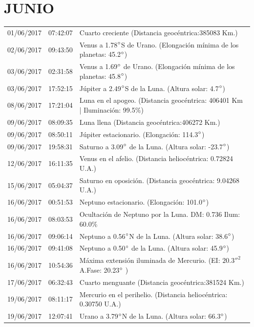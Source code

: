 \documentclass[12pt,a4paper,oneside]{article}
\begin{document}
\section{JUNIO}
\begin{center}
\begin{tabular}{ |l| l| l| }
\hline
01/06/2017& 07:42:07 &	Cuarto creciente (Distancia geocéntrica:385083 Km.)	\\
02/06/2017& 09:43:50 &	Venus a 1.78$\degree $S de Urano. (Elongación mínima de los planetas: 45.2$\degree $)	\\
03/06/2017& 02:31:58 &	Venus a 1.69$\degree $ de Urano. (Elongación mínima de los planetas: 45.8$\degree $)	\\
03/06/2017& 17:52:15 &	Júpiter a 2.49$\degree $S de la Luna. (Altura solar: 4.7$\degree $)	\\
08/06/2017& 17:21:04 &	Luna en el apogeo. (Distancia geocéntrica: 406401 Km | Iluminación: 99.5\%)	\\
09/06/2017& 08:09:35 &	Luna llena (Distancia geocéntrica:406272 Km.)	\\
09/06/2017& 08:50:11 &	Júpiter estacionario. (Elongación: 114.3$\degree $)	\\
09/06/2017& 19:58:31 &	Saturno a 3.09$\degree $ de la Luna. (Altura solar: -23.7$\degree $)	\\
12/06/2017& 16:11:35 &	Venus en el afelio. (Distancia heliocéntrica: 0.72824 U.A.)	\\
15/06/2017& 05:04:37 &	Saturno en oposición. (Distancia geocéntrica: 9.04268 U.A.)	\\
16/06/2017& 00:51:53 &	Neptuno estacionario. (Elongación: 101.0$\degree $)	\\
16/06/2017& 08:03:53 &	Ocultación de Neptuno por la Luna. DM: 0.736 Ilum: 60.0\% 	\\
16/06/2017& 09:06:14 &	Neptuno a 0.56$\degree $N de la Luna. (Altura solar: 38.6$\degree $)	\\
16/06/2017& 09:41:08 &	Neptuno a 0.50$\degree $ de la Luna. (Altura solar: 45.9$\degree $)	\\
16/06/2017& 10:54:36 &	Máxima extensión iluminada de Mercurio. (EI: $20.3''^2$ A.Fase: 20.23$\degree $ )	\\
17/06/2017& 06:32:43 &	Cuarto menguante (Distancia geocéntrica:381524 Km.)	\\
19/06/2017& 08:11:17 &	Mercurio en el perihelio. (Distancia heliocéntrica: 0.30750 U.A.)	\\
19/06/2017& 12:07:41 &	Urano a 3.79$\degree $N de la Luna. (Altura solar: 66.3$\degree $)	\\

\end{tabular}
\end{center}
\end{document}
